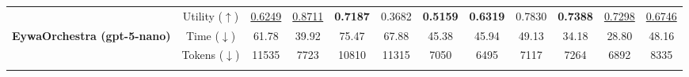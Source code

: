 \begin{table}[!t]
{\begin{tabular}{l|c|ccc|ccc|ccc|c}
        & Utility ($\uparrow$)   & \underline{0.6249} & \underline{0.8711} & \textbf{0.7187} & 0.3682 & \textbf{0.5159} & \textbf{0.6319} & 0.7830 & \textbf{0.7388} & \underline{0.7298} & \underline{0.6746}\\
        \textbf{EywaOrchestra (gpt-5-nano)}
        & Time ($\downarrow$)  & 61.78 & 39.92 & 75.47 & 67.88 & 45.38 & 45.94 & 49.13 & 34.18 & 28.80 & 48.16\\
        & Tokens ($\downarrow$) & 11535 & 7723 & 10810 & 11315 & 7050 & 6495 & 7117 & 7264 & 6892 & 8335\\
        [-0.4ex]\bottomrule\addlinespace[-0.000ex]

    \end{tabular}
    }
    \vspace{-4pt}
\end{table}